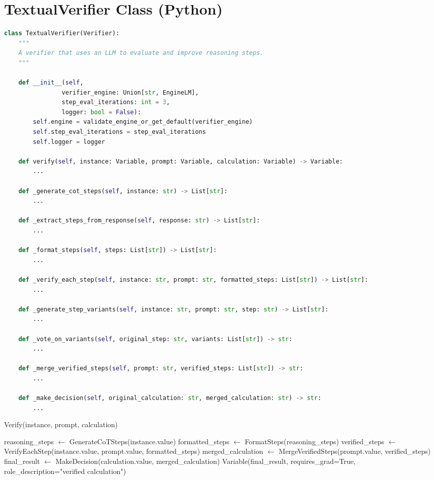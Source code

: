 \documentclass{article}
\begin{document}
\section*{TextualVerifier Class (Python)}
\begin{lstlisting}[language=Python]
class TextualVerifier(Verifier):
    """
    A verifier that uses an LLM to evaluate and improve reasoning steps.
    """

    def __init__(self,
                verifier_engine: Union[str, EngineLM], 
                step_eval_iterations: int = 3, 
                logger: bool = False):
        self.engine = validate_engine_or_get_default(verifier_engine)
        self.step_eval_iterations = step_eval_iterations
        self.logger = logger

    def verify(self, instance: Variable, prompt: Variable, calculation: Variable) -> Variable:
        ...

    def _generate_cot_steps(self, instance: str) -> List[str]:
        ...

    def _extract_steps_from_response(self, response: str) -> List[str]:
        ...

    def _format_steps(self, steps: List[str]) -> List[str]:
        ...

    def _verify_each_step(self, instance: str, prompt: str, formatted_steps: List[str]) -> List[str]:
        ...

    def _generate_step_variants(self, instance: str, prompt: str, step: str) -> List[str]:
        ...

    def _vote_on_variants(self, original_step: str, variants: List[str]) -> str:
        ...

    def _merge_verified_steps(self, prompt: str, verified_steps: List[str]) -> str:
        ...

    def _make_decision(self, original_calculation: str, merged_calculation: str) -> str:
        ...
\end{lstlisting}

\begin{algorithm}
\caption{Verify(instance, prompt, calculation)}
\begin{algorithmic}[1]
\State reasoning\_steps $\gets$ GenerateCoTSteps(instance.value)
\State formatted\_steps $\gets$ FormatSteps(reasoning\_steps)
\State verified\_steps $\gets$ VerifyEachStep(instance.value, prompt.value, formatted\_steps)
\State merged\_calculation $\gets$ MergeVerifiedSteps(prompt.value, verified\_steps)
\State final\_result $\gets$ MakeDecision(calculation.value, merged\_calculation)
\State \Return Variable(final\_result, requires\_grad=True, role\_description="verified calculation")
\end{algorithmic}
\end{algorithm}
\end{document}
